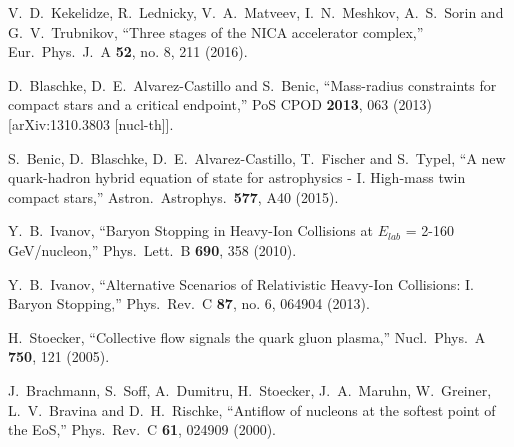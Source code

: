 \documentclass{webofc}
\begin{document}
\begin{thebibliography}{}
  V.~D.~Kekelidze, R.~Lednicky, V.~A.~Matveev, I.~N.~Meshkov, A.~S.~Sorin and G.~V.~Trubnikov,
  ``Three stages of the NICA accelerator complex,''
  Eur.\ Phys.\ J.\ A {\bf 52}, no. 8, 211 (2016).
  
  D.~Blaschke, D.~E.~Alvarez-Castillo and S.~Benic,
  ``Mass-radius constraints for compact stars and a critical endpoint,''
  PoS CPOD {\bf 2013}, 063 (2013)
  [arXiv:1310.3803 [nucl-th]].
 
  S.~Benic, D.~Blaschke, D.~E.~Alvarez-Castillo, T.~Fischer and S.~Typel,
  ``A new quark-hadron hybrid equation of state for astrophysics - I. High-mass twin compact stars,''
  Astron.\ Astrophys.\  {\bf 577}, A40 (2015).
  
  Y.~B.~Ivanov,
  ``Baryon Stopping in Heavy-Ion Collisions at $E_{lab}$ = 2-160 GeV/nucleon,''
  Phys.\ Lett.\ B {\bf 690}, 358 (2010).

  Y.~B.~Ivanov,
  ``Alternative Scenarios of Relativistic Heavy-Ion Collisions: I. Baryon Stopping,''
  Phys.\ Rev.\ C {\bf 87}, no. 6, 064904 (2013).

  
  
  H.~Stoecker,
  ``Collective flow signals the quark gluon plasma,''
  Nucl.\ Phys.\ A {\bf 750}, 121 (2005).

  J.~Brachmann, S.~Soff, A.~Dumitru, H.~Stoecker, J.~A.~Maruhn, W.~Greiner, L.~V.~Bravina and D.~H.~Rischke,
  ``Antiflow of nucleons at the softest point of the EoS,''
  Phys.\ Rev.\ C {\bf 61}, 024909 (2000).


\end{thebibliography}
\end{document}
